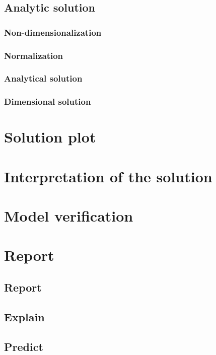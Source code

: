 \documentclass[9pt,reqno]{amsart}
\begin{document}
\subsection{Analytic solution}
%


\subsubsection{Non-dimensionalization}
%


\subsubsection{Normalization}
%


\subsubsection{Analytical solution}
%


\subsubsection{Dimensional solution}
%


\section{Solution plot}
%


\section{Interpretation of the solution}
%


\section{Model verification}
%


\section{Report}
%


\subsection{Report}
%


\subsection{Explain}
%


\subsection{Predict}
%
\end{document}
